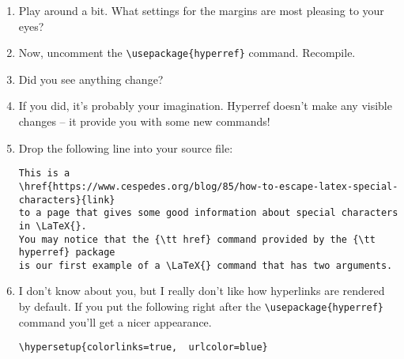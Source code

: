 \begin{enumerate}
\begin{codeblock}
\begin{verbatim}
\usepackage[bottom=1in, right=.5in, left=.5in, top=1in]{geometry}
\end{verbatim}
\end{codeblock}
\medskip

    \item Play around a bit.  What settings for the margins are most pleasing to your eyes?
    \item Now, uncomment the \verb+\usepackage{hyperref}+ command.  Recompile.
    \item Did you see anything change?
    \item If you did, it's probably your imagination. Hyperref doesn't make any visible changes -- it provide you with some new commands!
    \item Drop the following line into your source file:
\medskip

\begin{codeblock}
\begin{verbatim}
This is a 
\href{https://www.cespedes.org/blog/85/how-to-escape-latex-special-characters}{link} 
to a page that gives some good information about special characters in \LaTeX{}.  
You may notice that the {\tt href} command provided by the {\tt hyperref} package 
is our first example of a \LaTeX{} command that has two arguments.
\end{verbatim}
\end{codeblock}
\medskip

	\item I don't know about you, but I really don't like how hyperlinks are rendered by default.  If you put the following right after the \verb+\usepackage{hyperref}+ command you'll get a nicer appearance.
\medskip

\begin{codeblock}
\begin{verbatim}
\hypersetup{colorlinks=true,  urlcolor=blue}
\end{verbatim}
\end{codeblock}
\medskip


\end{enumerate}
